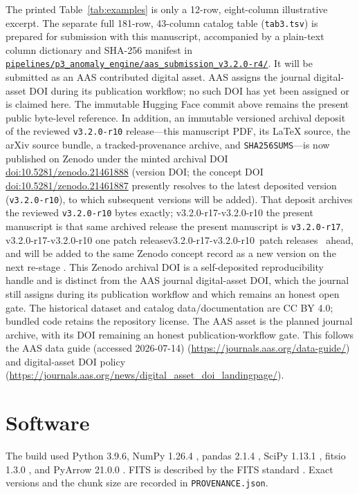 \documentclass[twocolumn,linenumbers]{aastex702}
\makeatletter
\newcommand{\paperVersion}{v3.2.0-r17}
\newcommand{\depositVersion}{v3.2.0-r10}
\def\bb@afterR#1-r#2\@nil{#2}                 %
\newcommand{\patchOf}[1]{\expandafter\bb@afterR#1\@nil}
\newcommand{\bb@patchDelta}{\numexpr\patchOf{\paperVersion}-\patchOf{\depositVersion}\relax}
\newcommand{\depositRelation}{%
  \ifnum\bb@patchDelta=0
    the present manuscript is that same archived release%
  \else
    the present manuscript is \texttt{\paperVersion}, %
    \ifnum\bb@patchDelta=1 one patch release\else\the\bb@patchDelta\ patch releases\fi\ %
    ahead, and will be added to the same Zenodo concept record as a new version
    on the next re-stage%
  \fi}
\makeatother
\begin{document}
The printed Table~\ref{tab:examples} is only a 12-row, eight-column illustrative excerpt.  The
separate full 181-row, 43-column catalog table (\texttt{tab3.tsv}) is prepared for submission with
this manuscript, accompanied by a plain-text column dictionary and SHA-256
manifest in
\href{https://github.com/Hubify-Projects/bigbounce/tree/main/pipelines/p3_anomaly_engine/aas_submission_v3.2.0-r4}{\nolinkurl{pipelines/p3_anomaly_engine/aas_submission_v3.2.0-r4/}}.  It will be submitted as an
AAS contributed digital asset.  AAS assigns the journal digital-asset DOI during its publication
workflow; no such DOI has yet been assigned or is claimed here.  The immutable Hugging Face commit
above remains the present public byte-level reference.  In addition, an immutable versioned
archival deposit of the reviewed \texttt{\depositVersion} release---this manuscript PDF, its \LaTeX{}
source, the arXiv source bundle, a tracked-provenance archive, and \texttt{SHA256SUMS}---is now
published on Zenodo under the minted archival DOI
\href{https://doi.org/10.5281/zenodo.21461888}{doi:10.5281/zenodo.21461888} (version DOI; the
concept DOI \href{https://doi.org/10.5281/zenodo.21461887}{doi:10.5281/zenodo.21461887}
presently resolves to the latest deposited version (\texttt{\depositVersion}), to which subsequent
versions will be added).  That deposit archives the reviewed \texttt{\depositVersion} bytes exactly;
\depositRelation.  This Zenodo archival DOI is a self-deposited
reproducibility handle and is distinct from the AAS journal digital-asset DOI, which the journal
still assigns during its publication workflow and which remains an honest open gate.  The historical dataset and catalog
data/documentation are CC BY 4.0; bundled code retains the repository license.  The AAS asset is
the planned journal archive, with its DOI remaining an honest publication-workflow gate.  This follows the AAS data guide (accessed 2026-07-14)
(\url{https://journals.aas.org/data-guide/}) and digital-asset DOI policy
(\url{https://journals.aas.org/news/digital_asset_doi_landingpage/}).

\section*{Software}

The build used Python 3.9.6, NumPy 1.26.4 \citep{Harris2020}, pandas 2.1.4
\citep{McKinney2010}, SciPy 1.13.1 \citep{Virtanen2020}, fitsio 1.3.0
\citep{SheldonFitsio}, and PyArrow 21.0.0 \citep{ApacheArrow}.  FITS is described by
the FITS standard \citep{Pence2010}.  Exact versions and the chunk size are recorded in
\texttt{PROVENANCE.json}.
\end{document}
